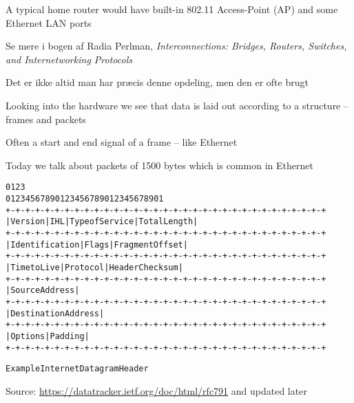 \documentclass[Screen16to9,17pt]{foils}
\begin{document}


\begin{list1}
\item A typical home router would have built-in 802.11 Access-Point (AP) and some Ethernet LAN ports
\end{list1}




Se mere i bogen af Radia Perlman, \emph{Interconnections: Bridges, Routers, Switches, and Internetworking Protocols}



\centerline{Det er ikke altid man har præcis denne opdeling, men den er ofte brugt}





\begin{list1}
\item Looking into the hardware we see that data is laid out according to a structure -- frames and packets
\item Often a start and end signal of a frame -- like Ethernet
\item Today we talk about packets of 1500 bytes which is common in Ethernet
\end{list1}




\begin{alltt}\footnotesize
    0                   1                   2                   3
    0 1 2 3 4 5 6 7 8 9 0 1 2 3 4 5 6 7 8 9 0 1 2 3 4 5 6 7 8 9 0 1
   +-+-+-+-+-+-+-+-+-+-+-+-+-+-+-+-+-+-+-+-+-+-+-+-+-+-+-+-+-+-+-+-+
   |Version|  IHL  |Type of Service|          Total Length         |
   +-+-+-+-+-+-+-+-+-+-+-+-+-+-+-+-+-+-+-+-+-+-+-+-+-+-+-+-+-+-+-+-+
   |         Identification        |Flags|      Fragment Offset    |
   +-+-+-+-+-+-+-+-+-+-+-+-+-+-+-+-+-+-+-+-+-+-+-+-+-+-+-+-+-+-+-+-+
   |  Time to Live |    Protocol   |         Header Checksum       |
   +-+-+-+-+-+-+-+-+-+-+-+-+-+-+-+-+-+-+-+-+-+-+-+-+-+-+-+-+-+-+-+-+
   |                       Source Address                          |
   +-+-+-+-+-+-+-+-+-+-+-+-+-+-+-+-+-+-+-+-+-+-+-+-+-+-+-+-+-+-+-+-+
   |                    Destination Address                        |
   +-+-+-+-+-+-+-+-+-+-+-+-+-+-+-+-+-+-+-+-+-+-+-+-+-+-+-+-+-+-+-+-+
   |                    Options                    |    Padding    |
   +-+-+-+-+-+-+-+-+-+-+-+-+-+-+-+-+-+-+-+-+-+-+-+-+-+-+-+-+-+-+-+-+

                    Example Internet Datagram Header
\end{alltt}
Source: \url{https://datatracker.ietf.org/doc/html/rfc791} and updated later
\end{document}
